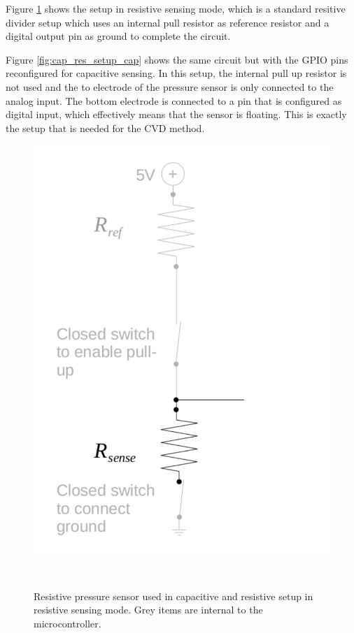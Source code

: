 \documentclass{sigchi-ext}
\begin{document}
Figure \ref{fig:cap_res_setup_res} shows the setup in resistive sensing mode,
which is a standard resitive divider setup which uses an internal pull resistor
as reference resistor and a digital output pin as ground to complete the
circuit.

Figure \ref{fig:cap_res_setup_cap} shows the same circuit but with the GPIO pins
reconfigured for capacitive sensing. In this setup, the internal pull up
resistor is not used and the to electrode of the pressure sensor is only
connected to the analog input. The bottom electrode is connected to a pin that
is configured as digital input, which effectively means that the sensor is
floating. This is exactly the setup that is needed for the CVD method.

\begin{figure}[!htbp]
\centering
  \includegraphics[width=0.9\columnwidth]{figures/cap_res_setup_res}
  \caption{Resistive pressure sensor used in capacitive and resistive setup in
resistive sensing mode. Grey items are internal to the
microcontroller.}~\label{fig:cap_res_setup_res}
\end{figure}
\end{document}
